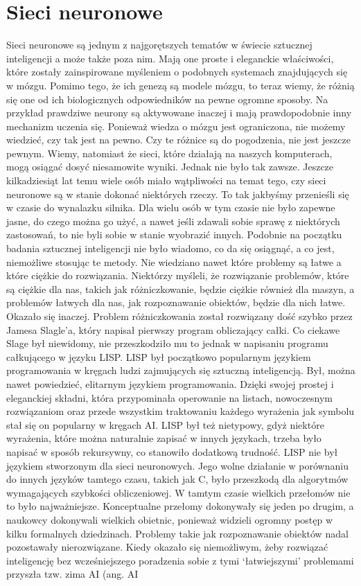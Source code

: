 \chapter{Sieci neuronowe}
\label{chap:nerual:nets}

Sieci neuronowe są jednym z najgorętszych tematów w świecie sztucznej inteligencji a może także poza nim. Mają one proste i eleganckie właściwości, które zostały zainspirowane myśleniem o podobnych systemach znajdujących się w mózgu. Pomimo tego, że ich genezą są modele mózgu, to teraz wiemy, że różnią się one od ich biologicznych odpowiedników na pewne ogromne sposoby. Na przykład prawdziwe neurony są aktywowane inaczej i mają prawdopodobnie inny mechanizm uczenia się. Ponieważ wiedza o mózgu jest ograniczona, nie możemy wiedzieć, czy tak jest na pewno. Czy te różnice są do pogodzenia, nie jest jeszcze pewnym. Wiemy, natomiast że sieci, które działają na naszych komputerach, mogą osiągać dosyć niesamowite wyniki. Jednak nie było tak zawsze. Jeszcze kilkadziesiąt lat temu wiele osób miało wątpliwości na temat tego, czy sieci neuronowe są w stanie dokonać niektórych rzeczy. To tak jakbyśmy przenieśli się w czasie do wynalazku silnika. Dla wielu osób w tym czasie nie było zapewne jasne, do czego można go użyć, a nawet jeśli zdawali sobie sprawę z niektórych zastosowań, to nie byli sobie w stanie wyobrazić innych. Podobnie na początku badania sztucznej inteligencji nie było wiadomo, co da się osiągnąć, a co jest, niemożliwe stosując te metody. Nie wiedziano nawet które problemy są łatwe a które ciężkie do rozwiązania. Niektórzy myśleli, że rozwiązanie problemów, które są ciężkie dla nas, takich jak różniczkowanie, będzie ciężkie również dla maszyn, a problemów łatwych dla nas, jak rozpoznawanie obiektów, będzie dla nich łatwe. Okazało się inaczej. Problem różniczkowania został rozwiązany dość szybko przez Jamesa Slagle’a, który napisał pierwszy program obliczający całki. Co ciekawe Slage był niewidomy, nie przeszkodziło mu to jednak w napisaniu programu całkującego w języku LISP. LISP był początkowo popularnym językiem programowania w kręgach ludzi zajmujących się sztuczną inteligencją. Był, można nawet powiedzieć, elitarnym językiem programowania. Dzięki swojej prostej i eleganckiej składni, która przypominała operowanie na listach, nowoczesnym rozwiązaniom oraz przede wszystkim traktowaniu każdego wyrażenia jak symbolu stał się on popularny w kręgach AI. LISP był też nietypowy, gdyż niektóre wyrażenia, które można naturalnie zapisać w innych językach, trzeba było napisać w sposób rekursywny, co stanowiło dodatkową trudność. LISP nie był językiem stworzonym dla sieci neuronowych. Jego wolne działanie w porównaniu do innych języków tamtego czasu, takich jak C, było przeszkodą dla algorytmów wymagających szybkości obliczeniowej. W tamtym czasie wielkich przełomów nie to było najważniejsze. Konceptualne przełomy dokonywały się jeden po drugim, a naukowcy dokonywali wielkich obietnic, ponieważ widzieli ogromny postęp w kilku formalnych dziedzinach. Problemy takie jak rozpoznawanie obiektów nadal pozostawały nierozwiązane. Kiedy okazało się niemożliwym, żeby rozwiązać inteligencję bez wcześniejszego poradzenia sobie z tymi ‘łatwiejszymi’ problemami przyszła tzw. zima AI (ang. AI 